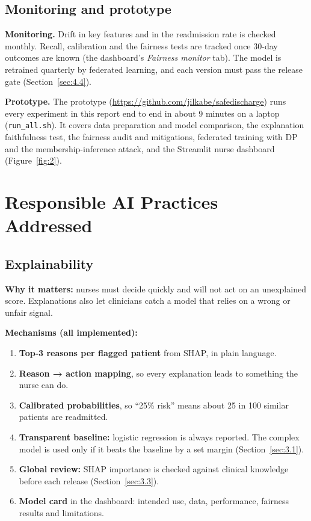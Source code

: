 \documentclass[10pt,a4paper]{article}
\newcommand{\lead}[1]{\needspace{4\baselineskip}\textbf{#1}}
\begin{document}
\subsection{Monitoring and prototype}\label{sec:3.5}

\textbf{Monitoring.} Drift in key features and in the readmission rate is checked monthly. Recall, calibration and the fairness tests are tracked once 30-day outcomes are known (the dashboard's \emph{Fairness monitor} tab). The model is retrained quarterly by federated learning, and each version must pass the release gate (Section~\ref{sec:4.4}).

\textbf{Prototype.} The prototype (\url{https://github.com/jilkabe/safedischarge}) runs every experiment in this report end to end in about 9 minutes on a laptop (\texttt{run\_all.sh}). It covers data preparation and model comparison, the explanation faithfulness test, the fairness audit and mitigations, federated training with DP and the membership-inference attack, and the Streamlit nurse dashboard (Figure~\ref{fig:2}).

\section{Responsible AI Practices Addressed}\label{sec:4}

\subsection{Explainability}\label{sec:4.1}

\textbf{Why it matters:} nurses must decide quickly and will not act on an unexplained score. Explanations also let clinicians catch a model that relies on a wrong or unfair signal.

\lead{Mechanisms (all implemented):}
\begin{enumerate}
\item \textbf{Top-3 reasons per flagged patient} from SHAP, in plain language.
\item \textbf{Reason → action mapping}, so every explanation leads to something the nurse can do.
\item \textbf{Calibrated probabilities}, so “25\% risk” means about 25 in 100 similar patients are readmitted.
\item \textbf{Transparent baseline:} logistic regression is always reported. The complex model is used only if it beats the baseline by a set margin (Section~\ref{sec:3.1}).
\item \textbf{Global review:} SHAP importance is checked against clinical knowledge before each release (Section~\ref{sec:3.3}).
\item \textbf{Model card} in the dashboard: intended use, data, performance, fairness results and limitations.
\end{enumerate}
\end{document}
